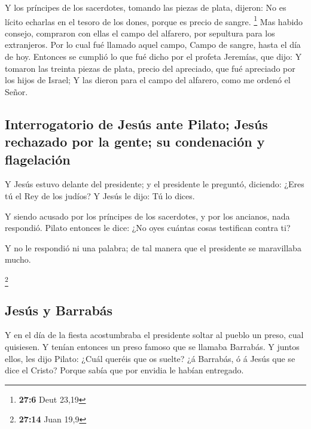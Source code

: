  Y los príncipes de los sacerdotes, tomando las piezas de
plata, dijeron: No es lícito echarlas en el tesoro de los dones, porque
es precio de sangre. \footnote{\textbf{27:6} Deut 23,19} 
Mas habido consejo, compraron con ellas el campo del alfarero, por
sepultura para los extranjeros.  Por lo cual fué llamado
aquel campo, Campo de sangre, hasta el día de hoy.  Entonces
se cumplió lo que fué dicho por el profeta Jeremías, que dijo: Y tomaron
las treinta piezas de plata, precio del apreciado, que fué apreciado por
los hijos de Israel;  Y las dieron para el campo del
alfarero, como me ordenó el Señor.

\hypertarget{interrogatorio-de-jesuxfas-ante-pilato-jesuxfas-rechazado-por-la-gente-su-condenaciuxf3n-y-flagelaciuxf3n}{%
\subsection{Interrogatorio de Jesús ante Pilato; Jesús rechazado por la
gente; su condenación y
flagelación}\label{interrogatorio-de-jesuxfas-ante-pilato-jesuxfas-rechazado-por-la-gente-su-condenaciuxf3n-y-flagelaciuxf3n}}

 Y Jesús estuvo delante del presidente; y el presidente le
preguntó, diciendo: ¿Eres tú el Rey de los judíos? Y Jesús le dijo: Tú
lo dices.

 Y siendo acusado por los príncipes de los sacerdotes, y
por los ancianos, nada respondió.  Pilato entonces le dice:
¿No oyes cuántas cosas testifican contra ti?

 Y no le respondió ni una palabra; de tal manera que el
presidente se maravillaba mucho.

\footnote{\textbf{27:14} Juan 19,9}

\hypertarget{jesuxfas-y-barrabuxe1s}{%
\subsection{Jesús y Barrabás}\label{jesuxfas-y-barrabuxe1s}}

 Y en el día de la fiesta acostumbraba el presidente soltar
al pueblo un preso, cual quisiesen.  Y tenían entonces un
preso famoso que se llamaba Barrabás.  Y juntos ellos, les
dijo Pilato: ¿Cuál queréis que os suelte? ¿á Barrabás, ó á Jesús que se
dice el Cristo?  Porque sabía que por envidia le habían
entregado.

